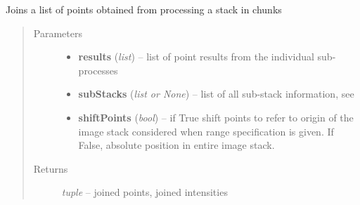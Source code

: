\documentclass[letterpaper,10pt,english]{sphinxmanual}
\begin{document}

\begin{fulllineitems}
\label{api/ClearMap.ImageProcessing:ClearMap.ImageProcessing.StackProcessing.joinPoints}
Joins a list of points obtained from processing a stack in chunks
\begin{quote}\begin{description}
\item[{Parameters}] \leavevmode\begin{itemize}
\item {} 
\textbf{results} (\emph{list}) --
list of point results from the individual sub-processes

\item {} 
\textbf{subStacks} (\emph{list or None}) --
list of all sub-stack information, see 

\item {} 
\textbf{shiftPoints} (\emph{bool}) --
if True shift points to refer to origin of the image stack considered
when range specification is given. If False, absolute
position in entire image stack.

\end{itemize}

\item[{Returns}] \leavevmode
\emph{tuple} --
joined points, joined intensities

\end{description}\end{quote}

\end{fulllineitems}

\end{document}
